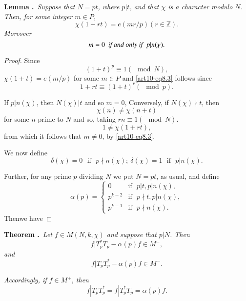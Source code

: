 \medskip
\noindent
{\bf Lemma .\label{art10-lem8.3}}~{\em Suppose that $N=pt$, where $p|t$, and that $\chi$ is a character modulo $N$. Then, for some integer $m\in P$,}
\begin{equation}
\chi(1+rt)=e(mr/p)(r\in \mathbb{Z}).\label{art10-eq8.3}
\end{equation}
{\em Moreover}
\begin{equation}
m=0\text{\em~ if and only if~ } p|n(\chi).\label{art10-eq8.4}
\end{equation}

\begin{proof}
Since
$$
(1+t)^{p}\equiv 1(\mod N),
$$
$\chi(1+t)=e(m/p)$ for some $m\in P$ and \eqref{art10-eq8.3} follows since
$$
1+rt\equiv (1+t)^{r}(\mod p).
$$

If $p|n(\chi)$, then $N(\chi)|t$ and so $m=0$, Conversely, if $N(\chi)\nmid t$, then
$$
\chi(n)\neq \chi(n+t)
$$
for some $n$ prime to $N$ and so, taking $rn\equiv 1(\mod N)$.
$$
1\neq \chi(1+rt),
$$
from which it follows that $m\neq 0$, by \eqref{art10-eq8.3}.

We now define
\begin{equation}
\delta(\chi)=0\text{~ if~ } p\nmid n(\chi); \ \delta(\chi)=1\text{~ if~ } p|n(\chi).\label{art10-eq8.5}
\end{equation}

Further, for any prime $p$ dividing $N$ we put $N=pt$, as usual, and define
\begin{equation}
\alpha(p)=
\begin{cases}
0 & \text{if~ } p|t, p|n(\chi),\\
p^{k-2} & \text{if~ } p\nmid t, p|n(\chi),\\
p^{k-1} & \text{if~ } p\nmid n(\chi).
\end{cases}\label{art10-eq8.6}
\end{equation}
Then\pageoriginale we have 
\end{proof}

\medskip
\noindent
{\bf Theorem .\label{art10-thm8.4}}~{\em Let $f\in M(N,k,\chi)$ and suppose that $p|N$. Then}
\begin{equation}
f|T^{*}_{p}T_{p}-\alpha(p)f\in M^{-},\label{art10-eq8.7}
\end{equation}
{\em and}
\begin{equation}
f|T_{p}T^{*}_{p}-\alpha(p)f\in M^{-}.\label{art10-eq8.8}
\end{equation}

{\em Accordingly, if $f\in M^{+}$, then}
\begin{equation}
f|T_{p}T^{*}_{p}=f|T^{*}_{p}T_{p}=\alpha (p)f.\label{art10-eq8.9}
\end{equation}

